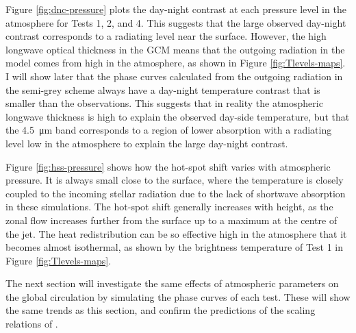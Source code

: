 Figure \ref{fig:dnc-pressure} plots the day-night contrast at each pressure level in the atmosphere for Tests 1, 2, and 4. This suggests that the large observed day-night contrast corresponds to a radiating level near the surface. However, the high longwave optical thickness in the GCM means that the outgoing radiation in the model comes from high in the atmosphere, as shown in Figure \ref{fig:Tlevels-maps}. I will show later that the phase curves calculated from the outgoing radiation in the semi-grey scheme always have a day-night temperature contrast that is smaller than the observations. This suggests that in reality the atmospheric longwave thickness is high to explain the observed day-side temperature, but that the \SI{4.5}{\micro\metre} band corresponds to a region of lower absorption with a radiating level low in the atmosphere to explain the large day-night contrast.

Figure \ref{fig:hss-pressure} shows how the hot-spot shift varies with atmospheric pressure. It is always small close to the surface, where the temperature is closely coupled to the incoming stellar radiation due to the lack of shortwave absorption in these simulations. The hot-spot shift generally increases with height, as the zonal flow increases further from the surface up to a maximum at the centre of the jet. The heat redistribution can be so effective high in the atmosphere that it becomes almost isothermal, as shown by the brightness temperature of Test 1 in Figure \ref{fig:Tlevels-maps}.

The next section will investigate the same effects of atmospheric parameters on the global circulation by simulating the phase curves of each test. These will show the same trends as this section, and confirm the predictions of the scaling relations of \citet{zhang2017dynamics}.

